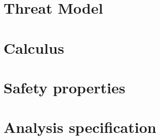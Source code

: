 \section{Threat Model}
\label{sec:ThreatModel}

\section{Calculus}
\label{sec:Calculus}

\section{Safety properties} %
\label{sec:SafetyProp}

\section{Analysis specification} %
\label{sec:AnalysisSpec}
